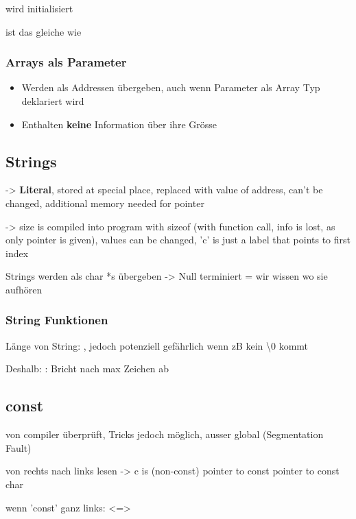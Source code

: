 \begin{multicols*}{4}
 wird initialisiert

 ist das gleiche wie 

\subsubsection{Arrays als Parameter}
\begin{itemize}
    \item Werden als Addressen übergeben, auch wenn Parameter als Array Typ deklariert wird
    \item Enthalten \textbf{keine} Information über ihre Grösse
\end{itemize}

\subsection{Strings}
 -> \textbf{Literal}, stored at special place, replaced with value of address, can't be changed, additional memory needed for pointer

 -> size is compiled into program with sizeof (with function call, info is lost, as only pointer is given), values can be changed, 'c' is just a label that points to first index

Strings werden als char *s übergeben -> Null terminiert = wir wissen wo sie aufhören

\subsubsection{String Funktionen}
Länge von String: , jedoch potenziell gefährlich wenn zB kein \textbackslash0 kommt

Deshalb: : Bricht nach max Zeichen ab


\subsection{const}
von compiler überprüft, Tricks jedoch möglich, ausser global (Segmentation Fault)\vspace{2pt}

von rechts nach links lesen
 -> c is (non-const) pointer to const pointer to const char

wenn 'const' ganz links:  <=> 


\end{multicols*}
